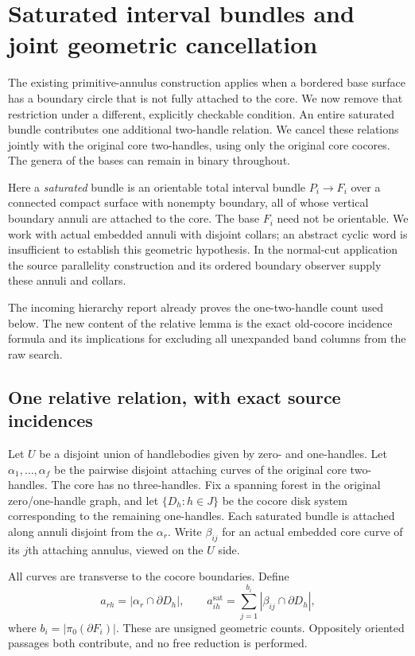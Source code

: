 \section{Saturated interval bundles and joint geometric cancellation}
\label{sec:saturated-bundles}

The existing primitive-annulus construction\cite{repo} applies when a bordered base
surface has a boundary circle that is not fully attached to the core.
We now remove that restriction under a different, explicitly checkable
condition.  An entire saturated bundle contributes one additional
two-handle relation.  We cancel these relations jointly with the original
core two-handles, using only the original core cocores.  The genera of the
bases can remain in binary throughout.

Here a \emph{saturated} bundle is an orientable total interval bundle
$P_i\to F_i$ over a connected compact surface with nonempty boundary, all
of whose vertical boundary annuli are attached to the core.  The base
$F_i$ need not be orientable.  We work with actual embedded annuli with
disjoint collars; an abstract cyclic word is insufficient to establish
this geometric hypothesis.  In the normal-cut application the source
parallelity construction and its ordered boundary observer supply these
annuli and collars.

The incoming hierarchy report\cite{hierarchy-incoming} already proves the
one-two-handle count used below. The new content of the relative lemma is
the exact old-cocore incidence formula and its implications for excluding
all unexpanded band columns from the raw search.

\subsection{One relative relation, with exact source incidences}

Let $U$ be a disjoint union of handlebodies given by zero- and one-handles.
Let $\alpha_1,\ldots,\alpha_f$ be the pairwise disjoint attaching curves of
the original core two-handles.  The core has no three-handles.  Fix a
spanning forest in the original zero/one-handle graph, and let
$\{D_h:h\in J\}$ be the cocore disk system corresponding to the remaining
one-handles.  Each saturated bundle is attached along annuli disjoint
from the $\alpha_r$.  Write $\beta_{ij}$ for an actual embedded core curve
of its $j$th attaching annulus, viewed on the $U$ side.

All curves are transverse to the cocore boundaries.  Define
\begin{equation}
 a_{rh}=|\alpha_r\cap\partial D_h|,\qquad
 a_{ih}^{\mathrm{sat}}
   =\sum_{j=1}^{b_i}|\beta_{ij}\cap\partial D_h|,
 \label{eq:saturated-incidences}
\end{equation}
where $b_i=|\pi_0(\partial F_i)|$.  These are unsigned geometric counts.
Oppositely oriented passages both contribute, and no free reduction is
performed.

